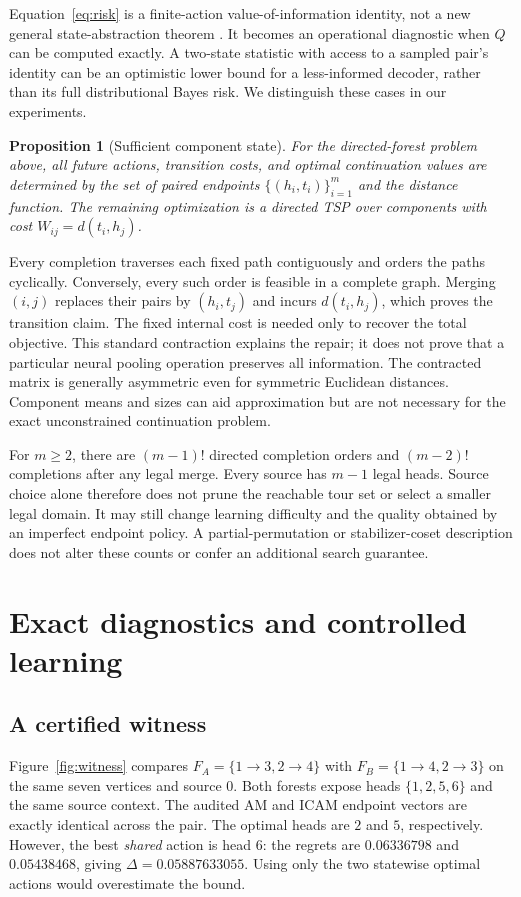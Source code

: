 \documentclass{article}
\newtheorem{proposition}{Proposition}
\begin{document}
Equation~\eqref{eq:risk} is a finite-action value-of-information identity,
not a new general state-abstraction theorem \citep{li2006abstraction}.
It becomes an operational diagnostic when $Q$ can be computed exactly.
A two-state statistic with access to a sampled pair's identity can be an
optimistic lower bound for a less-informed decoder, rather than its full
distributional Bayes risk. We distinguish these cases in our experiments.

\begin{proposition}[Sufficient component state]
\label{prop:contraction}
For the directed-forest problem above, all future actions, transition costs,
and optimal continuation values are determined by the set of paired endpoints
$\{(h_i,t_i)\}_{i=1}^m$ and the distance function. The remaining optimization
is a directed TSP over components with cost $W_{ij}=d(t_i,h_j)$.
\end{proposition}

Every completion traverses each fixed path contiguously and orders the paths
cyclically. Conversely, every such order is feasible in a complete graph.
Merging $(i,j)$ replaces their pairs by $(h_i,t_j)$ and incurs $d(t_i,h_j)$,
which proves the transition claim. The fixed internal cost is needed only to
recover the total objective. This standard contraction explains the repair;
it does not prove that a particular neural pooling operation preserves all
information. The contracted matrix is generally asymmetric even for symmetric
Euclidean distances. Component means and sizes can aid approximation but are
not necessary for the exact unconstrained continuation problem.

For $m\geq2$, there are $(m-1)!$ directed completion orders and $(m-2)!$ completions after
any legal merge. Every source has $m-1$ legal heads. Source choice alone
therefore does not prune the reachable tour set or select a smaller legal
domain. It may still change learning difficulty and the quality obtained by
an imperfect endpoint policy. A partial-permutation or stabilizer-coset
description does not alter these counts or confer an additional search guarantee.

\section{Exact diagnostics and controlled learning}
\label{sec:experiments}

\subsection{A certified witness}
\label{sec:witness}
Figure~\ref{fig:witness} compares $F_A=\{1\to3,2\to4\}$ with
$F_B=\{1\to4,2\to3\}$ on the same seven vertices and source $0$.
Both forests expose heads $\{1,2,5,6\}$ and the same source context.
The audited AM and ICAM endpoint vectors are exactly identical across the
pair. The optimal heads are $2$ and $5$, respectively. However, the best
\emph{shared} action is head $6$: the regrets are $0.06336798$ and
$0.05438468$, giving $\Delta=0.05887633055$. Using only the two
statewise optimal actions would overestimate the bound.
\end{document}
